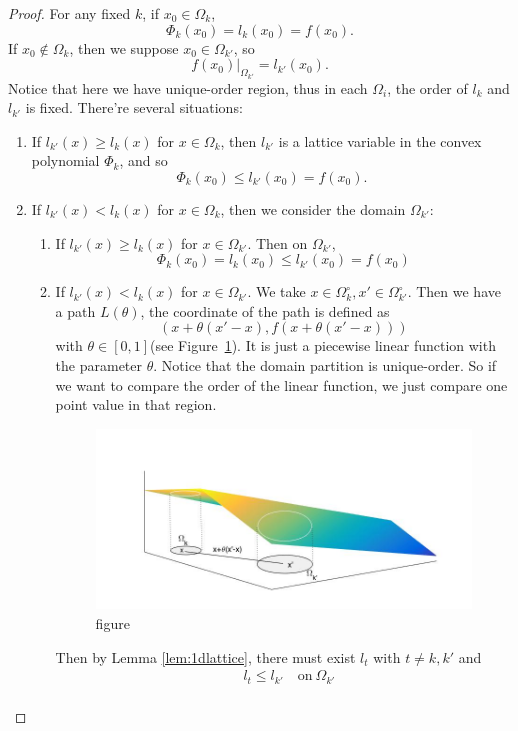 \begin{proof}
	
	For any fixed $k$, if $x_0\in\Omega_{k}$,
	$$
	\Phi_{k}(x_0)=l_k(x_0)= f(x_0).
	$$
	If $x_0\notin\Omega_{k}$, then we suppose $x_0\in \Omega_{k'}$, so 
	$$
	f(x_0)|_{\Omega_{k'}}=l_{k'}(x_0).
	$$ 
	Notice that here we have unique-order region, thus in each $\Omega_i$, the order of $l_k$ and $l_{k'}$ is fixed. There're several situations:
	\begin{enumerate}
		\item  If $l_{k'}(x)\ge l_{k}(x)$ for $x\in \Omega_{k}$, then $l_{k'}$ is a lattice variable in the convex polynomial $\Phi_k$, and so
		$$\Phi_{k}(x_0)\le l_{k'}(x_0)=f(x_0).$$
		\item  If $l_{k'}(x)< l_{k}(x)$ for $x\in \Omega_{k}$, then we consider the domain $\Omega_{k'}$:
		\begin{enumerate}
			\item 
			If $l_{k'}(x)\ge l_k(x)$ for $x\in \Omega_{k'}$. Then on $\Omega_{k'}$,
			\begin{equation*}
			\Phi_{k}(x_0)= l_k(x_0)\le l_{k'}(x_0)=f(x_0)
			\end{equation*}
			\item  
			If $l_{k'}(x)< l_k(x)$ for $x\in \Omega_{k'}$. We take $x\in \Omega_{k}^\circ, x' \in \Omega_{k'}^\circ$. Then we have a path $L(\theta)$, the coordinate of the path is defined as 
			$$
			(x + \theta(x'-x),f(x + \theta(x'-x)))
			$$ 
			with $\theta\in[0,1]$(see Figure~\ref{fig:sec:lattice}). It is just a piecewise linear function with the parameter $\theta$. Notice that the domain partition is unique-order. So if we want to compare the order of the linear function,  we just compare one point value in that region. 
		\begin{figure}[th]
			\centering
			\includegraphics[width=0.7\linewidth]{6DL/pic/fig2}
			\caption{figure}
			\label{fig:sec:lattice}
		\end{figure}
		Then by Lemma \ref{lem:1dlattice}, there must exist $l_t$ with $t\ne k,k'$ and
			\begin{equation*}
			\begin{aligned}
			&l_t\le l_{k'}\quad \mathrm{on}\ \Omega_{k'}\\

\end{aligned}
\end{equation*}
\end{enumerate}
\end{enumerate}
\end{proof}
